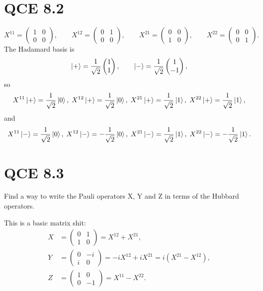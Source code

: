 \documentclass[10pt]{article}
\begin{document}
\section*{QCE 8.2}
\[
X^{11} =
\begin{pmatrix}
1 & 0 \\
0 & 0
\end{pmatrix},
\qquad
X^{12} =
\begin{pmatrix}
0 & 1 \\
0 & 0
\end{pmatrix},
\qquad
X^{21} =
\begin{pmatrix}
0 & 0 \\
1 & 0
\end{pmatrix},
\qquad
X^{22} =
\begin{pmatrix}
0 & 0 \\
0 & 1
\end{pmatrix}.
\]
The Hadamard basis is
\[
\ket{+} = 
\frac{1}{\sqrt{2}}
\begin{pmatrix}
1 \\
1
\end{pmatrix}, \qquad
\ket{-} = 
\frac{1}{\sqrt{2}}
\begin{pmatrix}
1 \\
-1
\end{pmatrix}, 
\]
so
\[
X^{11} \ket{+} =
\frac{1}{\sqrt{2}} \ket{0}, \;
X^{12} \ket{+} =
\frac{1}{\sqrt{2}} \ket{0}, \;
X^{21} \ket{+} =
\frac{1}{\sqrt{2}} \ket{1}, \;
X^{22} \ket{+} =
\frac{1}{\sqrt{2}} \ket{1},
\]
and
\[
X^{11} \ket{-} =
\frac{1}{\sqrt{2}} \ket{0}, \;
X^{12} \ket{-} =
- \frac{1}{\sqrt{2}} \ket{0}, \;
X^{21} \ket{-} =
\frac{1}{\sqrt{2}} \ket{1}, \;
X^{22} \ket{-} =
-\frac{1}{\sqrt{2}} \ket{1}.
\]

\section*{QCE 8.3}
Find a way to write the Pauli operators X, Y and Z in terms of the Hubbard operators.

This is a basic matrix shit:
\begin{align*}
X &=
\begin{pmatrix}
0 & 1 \\
1 & 0
\end{pmatrix}
= X^{12} + X^{21}, \\
Y &= \begin{pmatrix}
0 & -i \\
i  & 0 
\end{pmatrix}
= -i X^{12} + i X^{21} = i(X^{21} - X^{12}), \\
Z &= \begin{pmatrix}
1 & 0 \\
0 & -1
\end{pmatrix} 
= X^{11} - X^{22}.
\end{align*}
\end{document}
